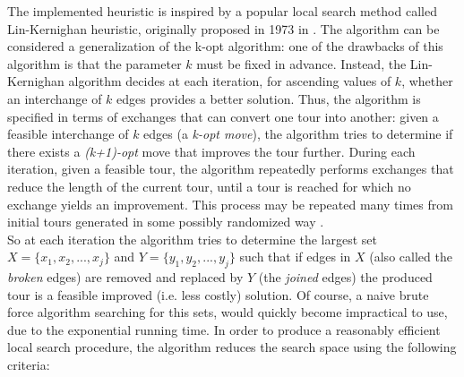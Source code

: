The implemented heuristic is inspired by a popular local search method called Lin-Kernighan heuristic, originally proposed in 1973 in \cite{LinK73}. The algorithm can be considered a generalization of the k-opt algorithm: one of the drawbacks of this algorithm is that the parameter $k$ must be fixed in advance. Instead, the Lin-Kernighan algorithm decides at each iteration, for ascending values of $k$, whether an interchange of $k$ edges provides a better solution. Thus, the algorithm is specified in terms of exchanges that can convert one tour into another: given a feasible interchange of $k$ edges (a \textit{k-opt move}), the algorithm tries to determine if there exists a \textit{(k+1)-opt} move that improves the tour further. 
During each iteration, given a feasible tour, the algorithm repeatedly performs exchanges that reduce the length of the current tour, until a tour is reached for which no exchange yields an improvement. This process may be repeated many times from initial tours generated in some possibly randomized way \cite{Helsgaun2000}.\\
So at each iteration the algorithm tries to determine the largest set $X=\{x_1, x_2, ..., x_j\}$ and $Y=\{y_1, y_2, ..., y_j\}$ such that if edges in $X$ (also called the \emph{broken} edges) are removed and replaced by $Y$ (the \emph{joined} edges) the produced tour is a feasible improved (i.e. less costly) solution. Of course, a naive brute force algorithm searching for this sets, would quickly become impractical to use, due to the exponential running time. In order to produce a reasonably efficient local search procedure, the algorithm reduces the search space using the following criteria:

